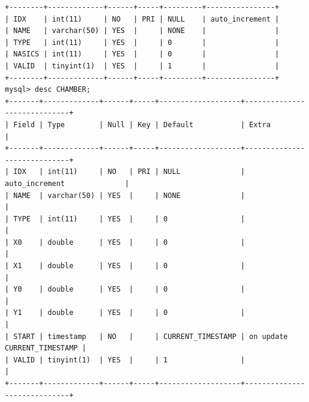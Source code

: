 \documentclass[english]{article}
\begin{document}
\begin{verbatim}
+--------+-------------+------+-----+---------+----------------+
| IDX    | int(11)     | NO   | PRI | NULL    | auto_increment |
| NAME   | varchar(50) | YES  |     | NONE    |                |
| TYPE   | int(11)     | YES  |     | 0       |                |
| NASICS | int(11)     | YES  |     | 0       |                |
| VALID  | tinyint(1)  | YES  |     | 1       |                |
+--------+-------------+------+-----+---------+----------------+
mysql> desc CHAMBER;
+-------+-------------+------+-----+-------------------+-----------------------------+
| Field | Type        | Null | Key | Default           | Extra                       |
+-------+-------------+------+-----+-------------------+-----------------------------+
| IDX   | int(11)     | NO   | PRI | NULL              | auto_increment              |
| NAME  | varchar(50) | YES  |     | NONE              |                             |
| TYPE  | int(11)     | YES  |     | 0                 |                             |
| X0    | double      | YES  |     | 0                 |                             |
| X1    | double      | YES  |     | 0                 |                             |
| Y0    | double      | YES  |     | 0                 |                             |
| Y1    | double      | YES  |     | 0                 |                             |
| START | timestamp   | NO   |     | CURRENT_TIMESTAMP | on update CURRENT_TIMESTAMP |
| VALID | tinyint(1)  | YES  |     | 1                 |                             |
+-------+-------------+------+-----+-------------------+-----------------------------+


\end{verbatim}
\end{document}
